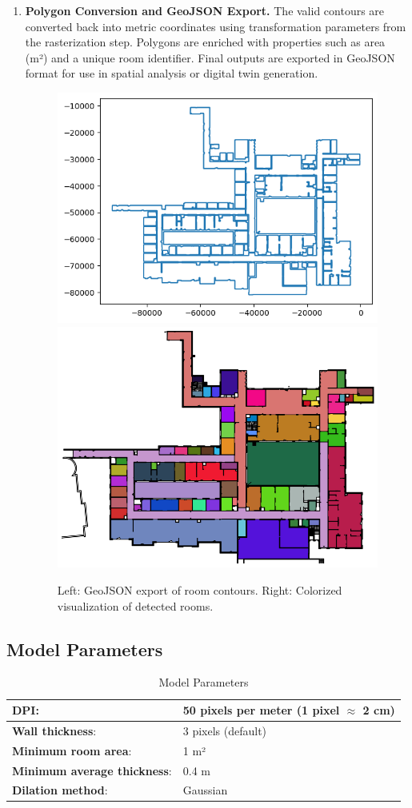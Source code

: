 \documentclass{article}
\begin{document}
\begin{enumerate}
    \item \textbf{Polygon Conversion and GeoJSON Export.} 
    The valid contours are converted back into metric coordinates using transformation parameters from the rasterization step. Polygons are enriched with properties such as area (m²) and a unique room identifier. Final outputs are exported in GeoJSON format for use in spatial analysis or digital twin generation.
    
    \begin{figure}[h]
        \centering
        \includegraphics[width=0.48\linewidth]{04.rooms_contours_geojson.png}
        \hfill
        \includegraphics[width=0.48\linewidth]{02.contours_image.png}
        \caption{Left: GeoJSON export of room contours. Right: Colorized visualization of detected rooms.}
        \label{fig:geojson_and_colored}
    \end{figure}

\end{enumerate}

\subsection{Model Parameters}

\begin{table}[h]
    \centering
    \begin{tabular}{|l|l|}
        \hline
        \textbf{DPI}: & 50 pixels per meter (1 pixel $\approx$ 2 cm) \\ \hline
        \textbf{Wall thickness}: & 3 pixels (default) \\ \hline
        \textbf{Minimum room area}: & 1 m² \\ \hline
        \textbf{Minimum average thickness}: & 0.4 m \\ \hline
        \textbf{Dilation method}: & Gaussian \\ \hline
    \end{tabular}
    \caption{Model Parameters}
    \label{tab:model_checkpoint}
\end{table}
\end{document}
